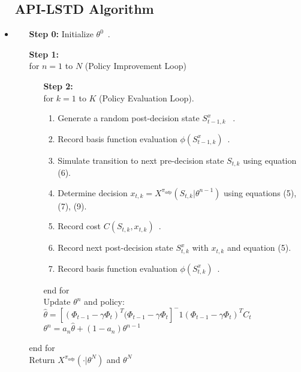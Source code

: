 \documentclass[12pt]{article} %
\begin{document}
\begin{itemize}
    \subsection*{API-LSTD Algorithm}
    \hline
    \hline
    \item \begin{center}
        \begin{enumerate}
            \item[\textbf{Step 0:}] Initialize $\theta^0$\ .
            \item[\textbf{Step 1:}]\ \\
                for $n = 1$ to $N$ (Policy Improvement Loop)\\
                \begin{enumerate}
                    \item[\textbf{Step 2:}]\ \\for $k=1$ to $K$ (Policy Evaluation Loop).
                \begin{enumerate}
                    \item Generate a random post-decision state $S_{t-1,k}^x$ \ .
                    \item Record basis function evaluation $\phi(S_{t-1,k}^x)$\ .
                    \item Simulate transition to next pre-decision state $S_{t,k}$ using equation (6).
                    \item Determine decision $x_{t, k} = X^{\pi_{adp}}(S_{t,k} | \theta^{n-1})$ using equations (5), (7), (9).
                    \item Record cost $C(S_{t,k}, x_{t,k})$\ .
                    \item Record next post-decision state $S_{t,k}^x$ with $x_{t,k}$ and equation (5).
                    \item Record basis function evaluation $\phi(S_{t,k}^x)$\ .
                \end{enumerate}
                end for\\
                Update $\theta^n$ and policy:
            \\$\hat{\theta} = [(\Phi_{t-1}-\gamma\Phi_{t})^T(\Phi_{t-1}-\gamma\Phi_{t}]^-1(\Phi_{t-1}-\gamma\Phi_{t})^TC_t$\\$\theta^n=a_n\hat{\theta}+(1-a_n)\theta^{n-1}$
                \end{enumerate}
            end for\\
            Return $X^{\pi_{adp}}(\cdot|\theta^N)$ and $\theta^N$\\

\end{enumerate}
\end{center}
\end{itemize}
\end{document}
